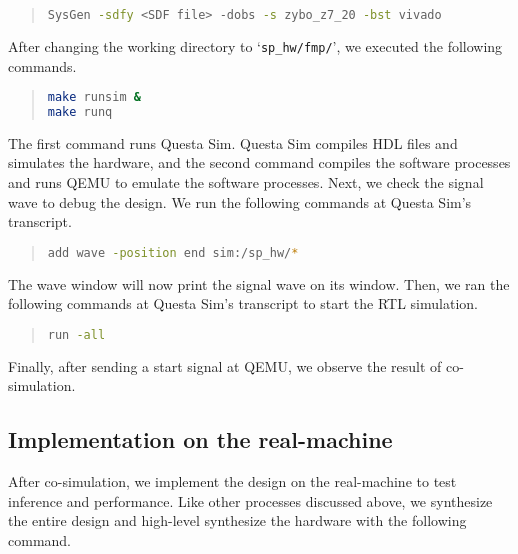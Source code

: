 \begin{quote}
\begin{lstlisting}[language=bash, numbers=none, frame=l]
SysGen -sdfy <SDF file> -dobs -s zybo_z7_20 -bst vivado
\end{lstlisting}
\end{quote}

 After changing the working directory to `\texttt{sp\_hw/fmp/}', we executed the following commands.

\begin{quote}
\begin{lstlisting}[language=bash, numbers=none, frame=l]
make runsim &
make runq
\end{lstlisting}
\end{quote}

The first command runs Questa Sim. Questa Sim compiles HDL files and simulates the hardware, and the second command compiles the software processes and runs QEMU to emulate the software processes. Next, we check the signal wave to debug the design. We run the following commands at Questa Sim's transcript.

\begin{quote}
\begin{lstlisting}[language=bash, numbers=none, frame=l]
add wave -position end sim:/sp_hw/*
\end{lstlisting}
\end{quote}

The wave window will now print the signal wave on its window. Then, we ran the following commands at Questa Sim's transcript to start the RTL simulation.

\begin{quote}
\begin{lstlisting}[language=bash, numbers=none, frame=l]
run -all
\end{lstlisting}
\end{quote}

Finally, after sending a start signal at QEMU, we observe the result of co-simulation.

\subsection{Implementation on the real-machine}

After co-simulation, we implement the design on the real-machine to test inference and performance. Like other processes discussed above, we synthesize the entire design and high-level synthesize the hardware with the following command.

